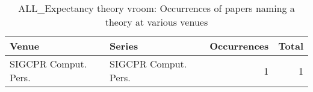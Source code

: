 \begin{table*}[t]
\begin{tabular}{llrr}
Venue & Series & Occurrences & Total\\\hline
\multirow{1}{*}{SIGCPR Comput. Pers.} & SIGCPR Comput. Pers. & 1 & \multirow{1}{*}{1}\\
\end{tabular}
\caption{ALL\_Expectancy theory vroom: Occurrences of papers naming a theory at various venues}
\end{table*}
